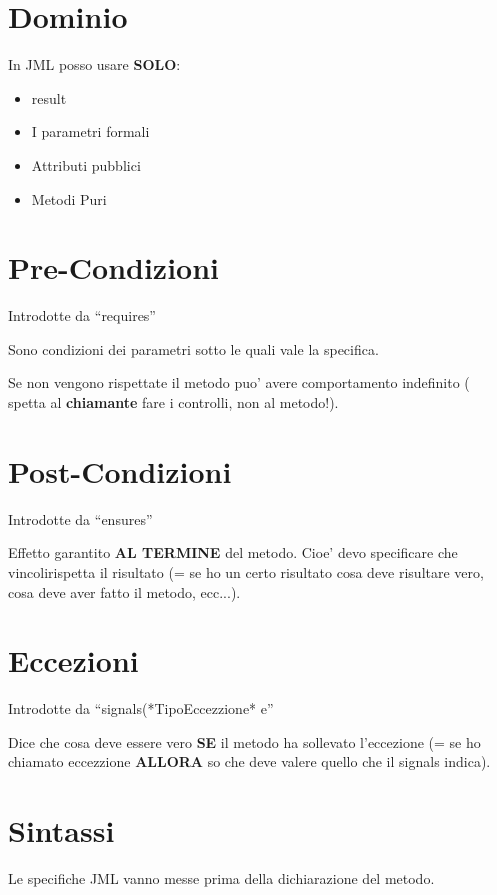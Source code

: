 \documentclass[\main/main.tex]{subfiles}
\begin{document}
\section{Dominio}
In JML posso usare \textbf{SOLO}:
\begin{itemize}
  \item  \bs result
  \item I parametri formali
  \item Attributi pubblici
  \item Metodi Puri
\end{itemize}






\section{Pre-Condizioni}
Introdotte da ``requires''

Sono condizioni dei parametri sotto le quali vale la specifica.

Se non vengono rispettate il metodo puo' avere comportamento indefinito ( spetta al \textbf{chiamante} fare i controlli, non al metodo!).





\section{Post-Condizioni}
Introdotte da ``ensures''

Effetto garantito \textbf{AL TERMINE} del metodo.
Cioe' devo specificare che vincolirispetta il risultato (= se ho un certo risultato cosa deve risultare vero, cosa deve aver fatto il metodo, ecc...).







\section{Eccezioni}
Introdotte da ``signals(*TipoEccezzione* e''

Dice che cosa deve essere vero \textbf{SE} il metodo ha sollevato l'eccezione (= se ho chiamato eccezzione \textbf{ALLORA} so che deve valere quello che il signals indica).





\section{Sintassi}
Le specifiche JML vanno messe prima della dichiarazione del metodo.
\end{document}
